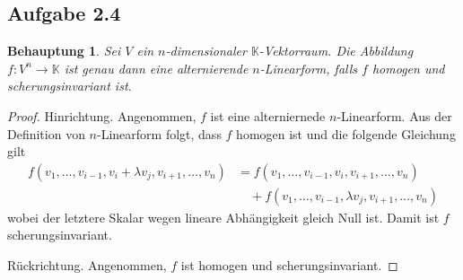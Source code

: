 \documentclass[draft,a5paper]{article}
\newtheorem*{beh}{Behauptung}
\begin{document}
\subsection*{Aufgabe 2.4}

\begin{beh}
  Sei \(V\) ein \(n\)-dimensionaler \(\mathbb{K}\)-Vektorraum.  Die Abbildung
  \(f \colon V^{n} \to \mathbb{K} \) ist genau dann eine alternierende
  \(n\)-Linearform, falls \(f\) homogen und scherungsinvariant ist.
\end{beh}

\begin{proof}
  Hinrichtung. Angenommen, \(f\) ist eine alterniernede
  \(n\)-Linearform.  Aus der Definition von \(n\)-Linearform folgt,
  dass \(f\) homogen ist und die folgende Gleichung gilt
  \begin{align*}
    f(v_{1}, \ldots, v_{i-1}, v_{i} + \lambda v_{j}, v_{i+1}, \ldots, v_{n})
    &= f(v_{1}, \ldots, v_{i-1}, v_{i}, v_{i+1}, \ldots, v_{n}) \\
    &\quad + f(v_{1}, \ldots, v_{i-1}, \lambda v_{j}, v_{i+1}, \ldots, v_{n})
  \end{align*}
  wobei der letztere Skalar wegen lineare Abhängigkeit gleich Null
  ist.  Damit ist \(f\) scherungsinvariant.

  Rückrichtung.  Angenommen, \(f\) ist homogen und scherungsinvariant.
\end{proof}
\end{document}
